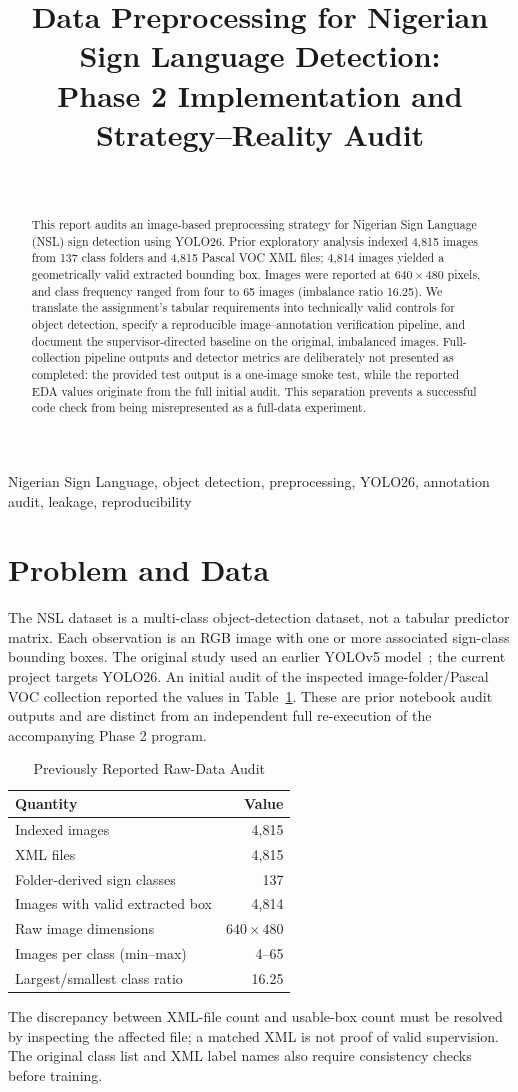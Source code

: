 \documentclass[conference]{IEEEtran}
\title{Data Preprocessing for Nigerian Sign Language Detection:\\Phase 2 Implementation and Strategy--Reality Audit}
\author{\IEEEauthorblockN{Candace Tariro Hunzwi}\\\IEEEauthorblockA{Carnegie Mellon University\\Engineering Artificial Intelligence}}
\begin{document}
\maketitle
\begin{abstract}
This report audits an image-based preprocessing strategy for Nigerian Sign Language (NSL) sign detection using YOLO26. Prior exploratory analysis indexed 4,815 images from 137 class folders and 4,815 Pascal VOC XML files; 4,814 images yielded a geometrically valid extracted bounding box. Images were reported at $640\times480$ pixels, and class frequency ranged from four to 65 images (imbalance ratio 16.25). We translate the assignment's tabular requirements into technically valid controls for object detection, specify a reproducible image--annotation verification pipeline, and document the supervisor-directed baseline on the original, imbalanced images. Full-collection pipeline outputs and detector metrics are deliberately not presented as completed: the provided test output is a one-image smoke test, while the reported EDA values originate from the full initial audit. This separation prevents a successful code check from being misrepresented as a full-data experiment.
\end{abstract}
\begin{IEEEkeywords}Nigerian Sign Language, object detection, preprocessing, YOLO26, annotation audit, leakage, reproducibility\end{IEEEkeywords}
\section{Problem and Data}
The NSL dataset is a multi-class object-detection dataset, not a tabular predictor matrix. Each observation is an RGB image with one or more associated sign-class bounding boxes. The original study used an earlier YOLOv5 model~\cite{kolawole}; the current project targets YOLO26. An initial audit of the inspected image-folder/Pascal VOC collection reported the values in Table~\ref{tab:audit}. These are prior notebook audit outputs and are distinct from an independent full re-execution of the accompanying Phase 2 program.
\begin{table}[!b]\caption{Previously Reported Raw-Data Audit}\label{tab:audit}\centering\begin{tabular}{lr}\toprule Quantity & Value\\\midrule Indexed images & 4,815\\XML files & 4,815\\Folder-derived sign classes & 137\\Images with valid extracted box & 4,814\\Raw image dimensions & $640\times480$\\Images per class (min--max) & 4--65\\Largest/smallest class ratio & 16.25\\\bottomrule\end{tabular}\end{table}
\FloatBarrier
The discrepancy between XML-file count and usable-box count must be resolved by inspecting the affected file; a matched XML is not proof of valid supervision. The original class list and XML label names also require consistency checks before training.
\end{document}
